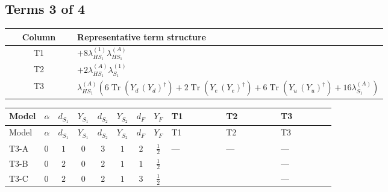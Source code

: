 \documentclass[8pt]{article}
\begin{document}
\begin{landscape}
\subsection*{Terms 3 of 4}
\begin{center}
\begin{tabular}{@{}c >{\raggedright\arraybackslash}p{0.82\linewidth}@{}}
\toprule
Column & Representative term structure \\
\midrule
T1 & \(\displaystyle +8 {\lambda_{HS_1}^{(1)}} {\lambda_{HS_1}^{(A)}}\) \\
\midrule
T2 & \(\displaystyle +2 {\lambda_{HS_1}^{(A)}} {\lambda_{S_1}^{(1)}}\) \\
\midrule
T3 & \(\displaystyle {\lambda_{HS_1}^{(A)}} (6 \operatorname{Tr}\!\left({Y_d}\,\left({Y_d}\right)^{\dagger}\right)+2 \operatorname{Tr}\!\left({Y_e}\,\left({Y_e}\right)^{\dagger}\right)+6 \operatorname{Tr}\!\left({Y_u}\,\left({Y_u}\right)^{\dagger}\right)+16 {\lambda_{S_1}^{(A)}})\) \\
\midrule
\bottomrule
\end{tabular}
\end{center}
\smallskip
\tiny
\begin{longtable}{@{}llcccccc >{\raggedright\arraybackslash}p{0.21\linewidth} >{\raggedright\arraybackslash}p{0.21\linewidth} >{\raggedright\arraybackslash}p{0.21\linewidth}@{}}
\toprule
Model & $\alpha$ & $d_{S_1}$ & $Y_{S_1}$ & $d_{S_2}$ & $Y_{S_2}$ & $d_F$ & $Y_F$ & T1 & T2 & T3 \\
\midrule
\endfirsthead
\toprule
Model & $\alpha$ & $d_{S_1}$ & $Y_{S_1}$ & $d_{S_2}$ & $Y_{S_2}$ & $d_F$ & $Y_F$ & T1 & T2 & T3 \\
\midrule
\endhead
T3-A & $0$ & $1$ & $0$ & $3$ & $1$ & $2$ & $\frac{1}{2}$ & --- & --- & --- \\
\midrule
T3-B & $0$ & $2$ & $0$ & $2$ & $1$ & $1$ & $\frac{1}{2}$ & \scriptsize\adjustbox{max width=\linewidth}{$\begin{gathered} +8 {\lambda_{HS_1}^{(1)}} {\lambda_{HS_1}^{(A)}}\end{gathered}$} & \scriptsize\adjustbox{max width=\linewidth}{$\begin{gathered} +2 {\lambda_{HS_1}^{(A)}} {\lambda_{S_1}^{(1)}}\end{gathered}$} & --- \\
\midrule
T3-C & $0$ & $2$ & $0$ & $2$ & $1$ & $3$ & $\frac{1}{2}$ & \scriptsize\adjustbox{max width=\linewidth}{$\begin{gathered} +8 {\lambda_{HS_1}^{(1)}} {\lambda_{HS_1}^{(A)}}\end{gathered}$} & \scriptsize\adjustbox{max width=\linewidth}{$\begin{gathered} +2 {\lambda_{HS_1}^{(A)}} {\lambda_{S_1}^{(1)}}\end{gathered}$} & --- \\

\end{longtable}
\end{landscape}
\end{document}
